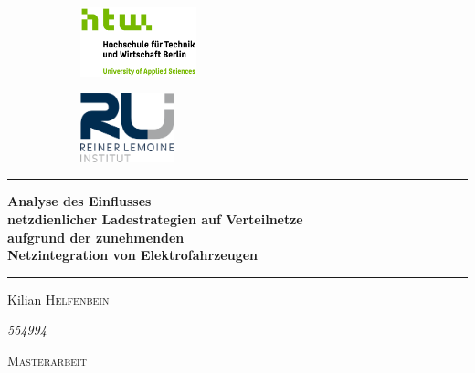 
\begin{titlepage}
    \begin{figure}
    \centering
    \begin{subfigure}{.5\textwidth}
      \hspace*{-1.5cm}\includegraphics[height=2cm, center]{Bilder/S04_HTW_Berlin_Logo_pos_FARBIG_RGB}
    \end{subfigure}%
    \begin{subfigure}{.5\textwidth}
      \hspace*{1.5cm}\includegraphics[height=2cm, center]{Bilder/RLI_logo_transparent}
    \end{subfigure}
    \end{figure}

	\vspace*{0.1cm}
    
	\centering
	\par\noindent\rule{\textwidth}{0.5pt}
	{\huge\bfseries Analyse des Einflusses\\
	netzdienlicher Ladestrategien auf Verteilnetze\\
	aufgrund der zunehmenden\\
	Netzintegration von Elektrofahrzeugen\par}
	\par\noindent\rule{\textwidth}{1pt}\par
	
	\vspace*{2cm}
	
	{\Large Kilian \textsc{Helfenbein}\par}
	{\large \textit{554994}\par}
	
	\vspace{1cm}
	
	{\scshape\huge Masterarbeit\par}
	
	\vspace{1cm}
	

\end{titlepage}
